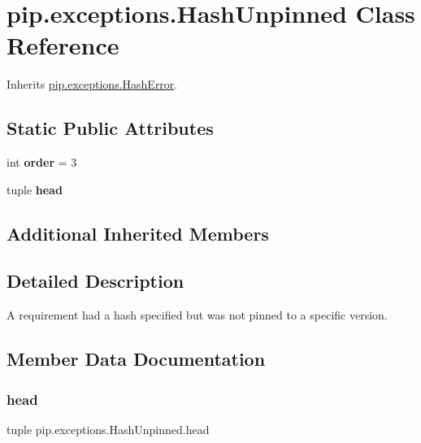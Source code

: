 \hypertarget{classpip_1_1exceptions_1_1_hash_unpinned}{}\section{pip.\+exceptions.\+Hash\+Unpinned Class Reference}
\label{classpip_1_1exceptions_1_1_hash_unpinned}


Inherits \hyperlink{classpip_1_1exceptions_1_1_hash_error}{pip.\+exceptions.\+Hash\+Error}.

\subsection*{Static Public Attributes}
\begin{DoxyCompactItemize}
\item 
\mbox{\label{classpip_1_1exceptions_1_1_hash_unpinned_afb298b39c9787610e3fbd45f76a3029d}} 
int {\bfseries order} = 3
\item 
tuple {\bfseries head}
\end{DoxyCompactItemize}
\subsection*{Additional Inherited Members}


\subsection{Detailed Description}
\begin{DoxyVerb}A requirement had a hash specified but was not pinned to a specific
version.\end{DoxyVerb}
 

\subsection{Member Data Documentation}
\mbox{\label{classpip_1_1exceptions_1_1_hash_unpinned_aad0d0d94dd852e266b273c1c9d1a5881}} 
\subsubsection{\texorpdfstring{head}{head}}
{\footnotesize\ttfamily tuple pip.\+exceptions.\+Hash\+Unpinned.\+head\hspace{0.3cm}{\ttfamily [static]}}

